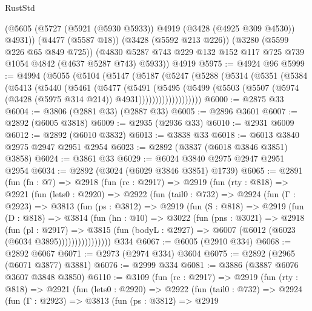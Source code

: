 \begin{lexlean}{RustStd}
\begin{coremodule}
      (@5605 (@5727 (@5921 (@5930 @5933)) @4919 (@3428 (@4925 @309 @4530)) @4931))
      (@4477 (@5587 @18))
      (@3428 (@5592 @213 @226))
      (@3280 (@5599 @226 @65 @849 @725))
      (@4830 @5287 @743 @229 @132 @152 @117 @725 @739 @1054 @4842 (@4637 @5287 @743) @5933))
    @4919
@5975 := @4924 @96
@5999 := @4994
    (@5055
      (@5104
        (@5147
          (@5187
            (@5247
              (@5288
                (@5314
                  (@5351
                    (@5384
                      (@5413
                        (@5440
                          (@5461
                            (@5477
                              (@5491
                                (@5495
                                  (@5499
                                    (@5503
                                      (@5507
                                        (@5974 (@3428 (@5975 @314 @214)) @4931)))))))))))))))))))
@6000 := @2875 @33
@6004 := @3806 (@2881 @33) (@2887 @33)
@6005 := @2896 @3601
@6007 := @2892 (@6005 @3818)
@6009 := @2935 (@2936 @33)
@6010 := @2931 @6009
@6012 := @2892 (@6010 @3832)
@6013 := @3838 @33
@6018 := @6013 @3840 @2975 @2947 @2951 @2954
@6023 := @2892 (@3837 (@6018 @3846 @3851) @3858)
@6024 := @3861 @33
@6029 := @6024 @3840 @2975 @2947 @2951 @2954
@6034 := @2892 (@3024 (@6029 @3846 @3851) @1739)
@6065 := @2891
    (fun (fn : @7) =>
    @2918
      (fun (rc : @2917) =>
      @2919
        (fun (rty : @818) =>
        @2921
          (fun (lets0 : @2920) =>
          @2922
            (fun (tail0 : @732) =>
            @2924
              (fun (Γ : @2923) =>
              @3813
                (fun (ps : @3812) =>
                @2919
                  (fun (S : @818) =>
                  @2919
                    (fun (D : @818) =>
                    @3814
                      (fun (hn : @10) =>
                      @3022
                        (fun (pns : @3021) =>
                        @2918
                          (fun (pl : @2917) =>
                          @3815
                            (fun (bodyL : @2927) => @6007 (@6012 (@6023 (@6034 @3895))))))))))))))))
    @334
@6067 := @6005 (@2910 @334)
@6068 := @2892 @6067
@6071 := @2973 (@2974 @334) @3604
@6075 := @2892 (@2965 (@6071 @3877) @3881)
@6076 := @2999 @334
@6081 := @3886 (@3887 @6076 @3607 @3848 @3850)
@6110 := @3109
    (fun (rc : @2917) =>
    @2919
      (fun (rty : @818) =>
      @2921
        (fun (lets0 : @2920) =>
        @2922
          (fun (tail0 : @732) =>
          @2924
            (fun (Γ : @2923) =>
            @3813
              (fun (ps : @3812) =>
              @2919

\end{coremodule}
\end{lexlean}

